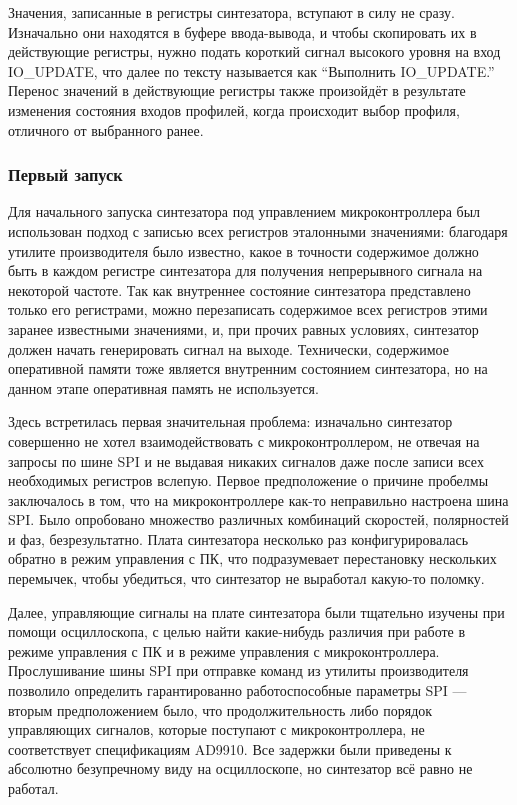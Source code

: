 \documentclass[rusmathsym, eqnumwithinsec, amspack, hyperref]{bomgost}
\begin{document}
Значения, записанные в регистры синтезатора, вступают в силу не сразу. Изначально они находятся в буфере ввода-вывода, и чтобы скопировать их в действующие регистры, нужно подать короткий сигнал высокого уровня на вход IO\_UPDATE, что далее по тексту называется как ``Выполнить IO\_UPDATE.'' Перенос значений в действующие регистры также произойдёт в результате изменения состояния входов профилей, когда происходит выбор профиля, отличного от выбранного ранее.

\subsubsection{Первый запуск}

Для начального запуска синтезатора под управлением микроконтроллера был использован подход с записью всех регистров эталонными значениями: благодаря утилите производителя было известно, какое в точности содержимое должно быть в каждом регистре синтезатора для получения непрерывного сигнала на некоторой частоте. Так как внутреннее состояние синтезатора представлено только его регистрами, можно перезаписать содержимое всех регистров этими заранее известными значениями, и, при прочих равных условиях, синтезатор должен начать генерировать сигнал на выходе. Технически, содержимое оперативной памяти тоже является внутренним состоянием синтезатора, но на данном этапе оперативная память не используется.

Здесь встретилась первая значительная проблема: изначально синтезатор совершенно не хотел взаимодействовать с микроконтроллером, не отвечая на запросы по шине SPI и не выдавая никаких сигналов даже после записи всех необходимых регистров вслепую. Первое предположение о причине пробелмы заключалось в том, что на микроконтроллере как-то неправильно настроена шина SPI. Было опробовано множество различных комбинаций скоростей, полярностей и фаз, безрезультатно. Плата синтезатора несколько раз конфигурировалась обратно в режим управления с ПК, что подразумевает перестановку нескольких перемычек, чтобы убедиться, что синтезатор не выработал какую-то поломку.

Далее, управляющие сигналы на плате синтезатора были тщательно изучены при помощи осциллоскопа, с целью найти какие-нибудь различия при работе в режиме управления с ПК и в режиме управления с микроконтроллера. Прослушивание шины SPI при отправке команд из утилиты производителя позволило определить гарантированно работоспособные параметры SPI --- вторым предположением было, что продолжительность либо порядок управляющих сигналов, которые поступают с микроконтроллера, не соответствует спецификациям AD9910. Все задержки были приведены к абсолютно безупречному виду на осциллоскопе, но синтезатор всё равно не работал.
\end{document}
